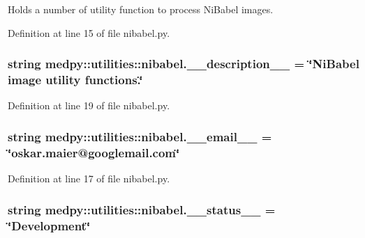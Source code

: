 Holds a number of utility function to process NiBabel images. 



Definition at line 15 of file nibabel.py.

\hypertarget{namespacemedpy_1_1utilities_1_1nibabel_aed62d192744122f84ec7eeec74c6936c}{
\subsubsection[{\_\-\_\-description\_\-\_\-}]{\setlength{\rightskip}{0pt plus 5cm}string {\bf medpy::utilities::nibabel.\_\-\_\-description\_\-\_\-} = \char`\"{}NiBabel image utility functions.\char`\"{}}}
\label{namespacemedpy_1_1utilities_1_1nibabel_aed62d192744122f84ec7eeec74c6936c}


Definition at line 19 of file nibabel.py.

\hypertarget{namespacemedpy_1_1utilities_1_1nibabel_a91134bb125f3b3ce85dbc67f73edafa3}{
\subsubsection[{\_\-\_\-email\_\-\_\-}]{\setlength{\rightskip}{0pt plus 5cm}string {\bf medpy::utilities::nibabel.\_\-\_\-email\_\-\_\-} = \char`\"{}oskar.maier@googlemail.com\char`\"{}}}
\label{namespacemedpy_1_1utilities_1_1nibabel_a91134bb125f3b3ce85dbc67f73edafa3}


Definition at line 17 of file nibabel.py.

\hypertarget{namespacemedpy_1_1utilities_1_1nibabel_ad6d46ba600da8eb4276c1c1d1cc45990}{
\subsubsection[{\_\-\_\-status\_\-\_\-}]{\setlength{\rightskip}{0pt plus 5cm}string {\bf medpy::utilities::nibabel.\_\-\_\-status\_\-\_\-} = \char`\"{}Development\char`\"{}}}
\label{namespacemedpy_1_1utilities_1_1nibabel_ad6d46ba600da8eb4276c1c1d1cc45990}


